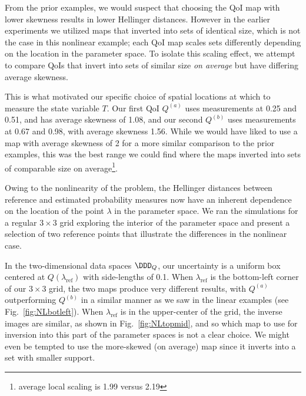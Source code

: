 From the prior examples, we would suspect that choosing the QoI map with lower skewness results in lower Hellinger distances. 
However in the earlier experiments we utilized maps that inverted into sets of identical size, which is not the case in this nonlinear example; each QoI map scales sets differently depending on the location in the parameter space. 
To isolate this scaling effect, we attempt to compare QoIs that invert into sets of similar size \emph{on average} but have differing average skewness.

This is what motivated our specific choice of spatial locations at which to measure the state variable $T$. 
Our first QoI $Q^{(a)}$ uses measurements at 0.25 and 0.51, and has average skewness of 1.08, and our second $Q^{(b)}$ uses measurements at 0.67 and 0.98, with average skewness 1.56. 
While we would have liked to use a map with average skewness of 2 for a more similar comparison to the prior examples, this was the best range we could find where the maps inverted into sets of comparable size on average\footnote{average local scaling is 1.99 versus 2.19}. 

Owing to the nonlinearity of the problem, the Hellinger distances between reference and estimated probability measures now have an inherent dependence on the location of the point $\lambda$ in the parameter space.
We ran the simulations for a regular $3\times3$ grid exploring the interior of the parameter space and present a selection of two reference points that illustrate the differences in the nonlinear case. 

In the two-dimensional data spaces $\DDD_Q$, our uncertainty is a uniform box centered at $Q(\lambda_{\text{ref}})$ with side-lengths of 0.1. When $\lambda_{\text{ref}}$ is the bottom-left corner of our $3\times3$ grid, the two maps produce very different results, with $Q^{(a)}$ outperforming $Q^{(b)}$ in a similar manner as we saw in the linear examples (see Fig.~\ref{fig:NLbotleft}). 
When $\lambda_{\text{ref}}$ is in the upper-center of the grid, the inverse images are similar, as shown in Fig.~\ref{fig:NLtopmid}, and so which map to use for inversion into this part of the parameter spaces is not a clear choice. We might even be tempted to use the more-skewed (on average) map since it inverts into a set with smaller support. 


